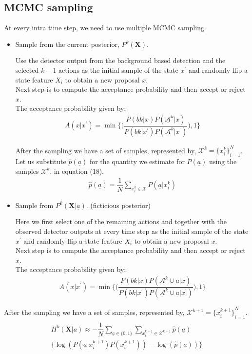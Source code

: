\documentclass[10pt,twocolumn,letterpaper]{article}
\begin{document}
\subsection{MCMC sampling}
At every intra time step, we need to use multiple MCMC sampling.
\begin{itemize}
\item Sample from the current posterior, $P^{k}(\textbf{X})$.

Use the detector output from the background based detection and the selected $k-1$ actions as the initial sample of the state $x^{'} $ and randomly flip a state feature $X_{i}$ to obtain a new proposal $x $.\\
Next step is to compute the acceptance probability and then accept or reject $x$.\\
The acceptance probability given by:
\begin{align}
A(x|x^{'}) = \min\Big\lbrace\Big(\dfrac{P(bk|x)P(\underline{\mathcal{A}}^{k}|x)}{P(bk|x^{'})P(\underline{\mathcal{A}}^{k}|x^{^{'}})}\Big),1\Big\rbrace
\end{align}

After the sampling we have a set of samples, represented by,
 $\mathcal{X}^{k}={\lbrace x^{k}_{i}\rbrace}^{N}_{i=1}$.\\
Let us substitute $\widehat{p}( \underline{a})$ for the quantity we estimate for $P( \underline{a})$ using the samples $\mathcal{X}^{k}$, in equation (18).
\begin{align}
\widehat{p}( \underline{a}) = \dfrac{1}{N}\sum_{x^{k}_{i}\in \mathcal{X}}P( \underline{a}|x_{i}^{k})
\end{align}


\item Sample from $P^{k}(\textbf{X}|\underline{a})$. (ficticious posterior)

Here we first select one of the remaining actions and together with the observed detector outputs at every time step as the initial sample of the state $x^{'} $ and randomly flip a state feature $X_{i}$ to obtain a new proposal $x $.\\
Next step is to compute the acceptance probability and then accept or reject $x$.\\
The acceptance probability given by:
\begin{align}
A(x|x^{'}) = \min\Big\lbrace\Big(\dfrac{P(bk|x)P(\underline{\mathcal{A}}^{k}\cup \underline{a}|x)}{P(bk|x^{'})P(\underline{\mathcal{A}}^{k}\cup \underline{a}|x^{^{'}})}\Big),1\Big\rbrace
\end{align}
\end{itemize}
After the sampling we have a set of samples, represented by,
 $\mathcal{X}^{k+1}={\lbrace x^{k+1}_{i}\rbrace}^{N}_{i=1}$.
\begin{align}
\begin{split}
H^{k}(\textbf{X}| a)\approx -\dfrac{1}{N}\sum_{\underline{a}\in\lbrace 0 ,1 \rbrace} \sum_{x_{i}^{k+1}\in\mathcal{X}^{k+1}} \widehat{p}( \underline{a})\\ \Big\lbrace\log(P( \underline{a}|x^{k+1}_{i})P(x^{k+1}_{i})) - \log(\widehat{p}( \underline{a}))\Big\rbrace
\end{split}
\end{align}
\end{document}
